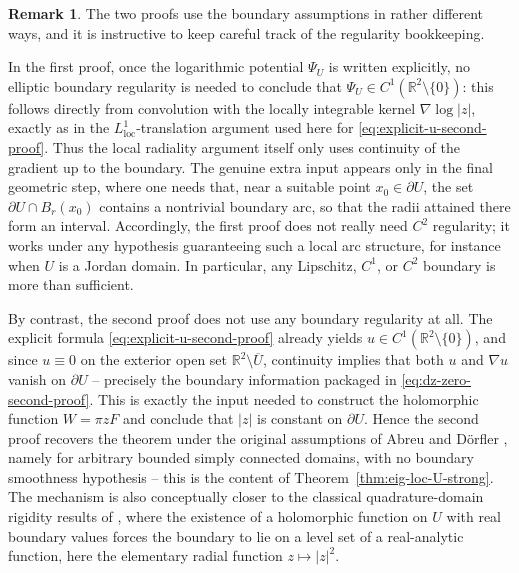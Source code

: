 \documentclass[a4paper,11pt,reqno]{amsart}
\numberwithin{equation}{section}
\theoremstyle{plain} %
\theoremstyle{definition} %
\newtheorem{remark}{Remark}[section]
\theoremstyle{remark}
\newcommand{\R}{\mathbb{R}}
\begin{document}
\begin{remark}\label{rem:bookkeeping-no-regularity}
The two proofs use the boundary assumptions in rather different ways, and it is instructive to
keep careful track of the regularity bookkeeping.

In the first proof, once the logarithmic potential \(\Psi_U\) is written explicitly, no elliptic
boundary regularity is needed to conclude that \(\Psi_U\in C^1(\R^2\setminus\{0\})\): this follows
directly from convolution with the locally integrable kernel \(\nabla\log|z|\), exactly as in the
\(L^1_{\mathrm{loc}}\)-translation argument used here for \eqref{eq:explicit-u-second-proof}. Thus
the local radiality argument itself only uses continuity of the gradient up to the boundary. The
genuine extra input appears only in the final geometric step, where one needs that, near a suitable
point \(x_0\in \partial U\), the set \(\partial U\cap B_r(x_0)\) contains a nontrivial boundary
arc, so that the radii attained there form an interval. Accordingly, the first proof does not
really need \(C^2\) regularity; it works under any hypothesis guaranteeing such a local arc
structure, for instance when \(U\) is a Jordan domain. In particular, any Lipschitz, \(C^1\), or
\(C^2\) boundary is more than sufficient.

By contrast, the second proof does not use any boundary regularity at all. The explicit formula
\eqref{eq:explicit-u-second-proof} already yields \(u\in C^1(\R^2\setminus\{0\})\), and since
\(u\equiv 0\) on the exterior open set \(\R^2\setminus \overline U\), continuity implies that both
\(u\) and \(\nabla u\) vanish on \(\partial U\) -- precisely the boundary information packaged in
\eqref{eq:dz-zero-second-proof}. This is exactly the input needed to construct the holomorphic
function \(W=\pi z F\) and conclude that \(|z|\) is constant on \(\partial U\). Hence the second
proof recovers the theorem under the original assumptions of Abreu and D\"orfler
\cite{Abreu-Doerfler}, namely for arbitrary bounded simply connected domains, with no boundary
smoothness hypothesis -- this is the content of
Theorem~\ref{thm:eig-loc-U-strong}. The mechanism is also conceptually closer to the classical
quadrature-domain rigidity results of \cite{Aharonov-Schiffer-Zalcman,Gustafsson,Karp}, where the
existence of a holomorphic function on \(U\) with real boundary values forces the boundary to lie
on a level set of a real-analytic function, here the elementary radial function
\(z\mapsto |z|^2\).


\end{remark}
\end{document}
